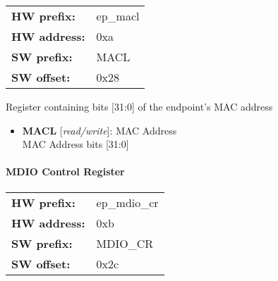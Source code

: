 \begin{tabular}{l l }
{\bf HW prefix:}  & ep\_macl\\
{\bf HW address:}  & 0xa\\
{\bf SW prefix:}  & MACL\\
{\bf SW offset:}  & 0x28\\
\end{tabular}

\vspace{12pt}
Register containing bits [31:0] of the endpoint's MAC address

\vspace{12pt}
\noindent
{}

\begin{itemize}
\item \begin{small}
{\bf 
MACL
} [\emph{read/write}]: MAC Address
\\
MAC Address bits [31:0]
\end{small}
\end{itemize}
\paragraph*{MDIO Control Register}\vspace{12pt}

\begin{tabular}{l l }
{\bf HW prefix:}  & ep\_mdio\_cr\\
{\bf HW address:}  & 0xb\\
{\bf SW prefix:}  & MDIO\_CR\\
{\bf SW offset:}  & 0x2c\\
\end{tabular}

